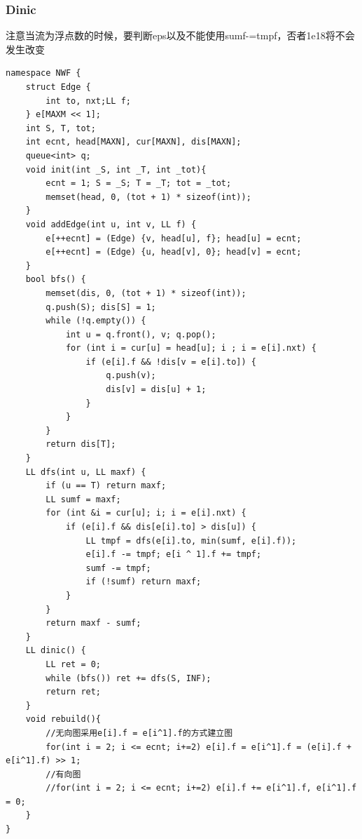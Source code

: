 \documentclass[10pt]{ctexart}
\begin{document}
{\subsubsection{Dinic}
注意当流为浮点数的时候，要判断eps以及不能使用sumf-=tmpf，否者1e18将不会发生改变
\begin{lstlisting}
namespace NWF {
    struct Edge {
        int to, nxt;LL f;
    } e[MAXM << 1]; 
    int S, T, tot;
    int ecnt, head[MAXN], cur[MAXN], dis[MAXN];
    queue<int> q;
    void init(int _S, int _T, int _tot){
        ecnt = 1; S = _S; T = _T; tot = _tot;
        memset(head, 0, (tot + 1) * sizeof(int));
    } 
    void addEdge(int u, int v, LL f) {
        e[++ecnt] = (Edge) {v, head[u], f}; head[u] = ecnt;
        e[++ecnt] = (Edge) {u, head[v], 0}; head[v] = ecnt;
    }
    bool bfs() {
        memset(dis, 0, (tot + 1) * sizeof(int));
        q.push(S); dis[S] = 1;
        while (!q.empty()) {
            int u = q.front(), v; q.pop();
            for (int i = cur[u] = head[u]; i ; i = e[i].nxt) {
                if (e[i].f && !dis[v = e[i].to]) {
                    q.push(v);
                    dis[v] = dis[u] + 1;
                }
            }
        }
        return dis[T];
    }
    LL dfs(int u, LL maxf) {
        if (u == T) return maxf;
        LL sumf = maxf;
        for (int &i = cur[u]; i; i = e[i].nxt) {
            if (e[i].f && dis[e[i].to] > dis[u]) {
                LL tmpf = dfs(e[i].to, min(sumf, e[i].f));
                e[i].f -= tmpf; e[i ^ 1].f += tmpf;
                sumf -= tmpf;
                if (!sumf) return maxf;
            }
        }
        return maxf - sumf;
    }
    LL dinic() {
        LL ret = 0;
        while (bfs()) ret += dfs(S, INF);
        return ret;
    }
    void rebuild(){
        //无向图采用e[i].f = e[i^1].f的方式建立图
        for(int i = 2; i <= ecnt; i+=2) e[i].f = e[i^1].f = (e[i].f + e[i^1].f) >> 1;
        //有向图
        //for(int i = 2; i <= ecnt; i+=2) e[i].f += e[i^1].f, e[i^1].f = 0;
    }
}
\end{lstlisting}
}
\end{document}
